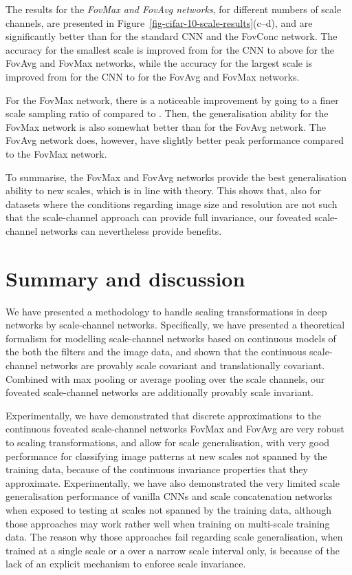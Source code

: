 \documentclass[twocolumn,runningheads]{svjour3}
\begin{document}
The results for the {\em FovMax and FovAvg networks\/}, for different numbers of
scale channels, are presented in Figure~\ref{fig-cifar-10-scale-results}(c--d), and
are significantly better than for the standard CNN and the FovConc
network. The accuracy for the smallest scale  is improved from  
for the CNN to above  for the FovAvg and FovMax networks, while the accuracy 
for the largest scale  is improved from  for the CNN to  for the FovAvg and FovMax networks. 

For the FovMax network, there is a noticeable improvement by going to
a finer scale sampling ratio of  compared to .
Then, the generalisation ability for the FovMax network is also somewhat better than for the
FovAvg network. The FovAvg network does, however, have slightly better peak performance compared to the FovMax network. 

To summarise, the FovMax and FovAvg networks provide the best generalisation
ability to new scales, which is in line with theory.
This shows that, also for datasets where the conditions regarding image size and
resolution are not such that the scale-channel approach can provide
full invariance, our foveated scale-channel networks can nevertheless
provide benefits.



\section{Summary and discussion}

We have presented a methodology to handle scaling transformations in
deep networks by scale-channel networks.
Spec\-ifically, we have presented a theoretical formalism for modelling scale-channel networks
based on continuous models of the both the filters and the image data,
and shown that the continuous scale-channel networks are provably scale
covariant and translationally covariant. Combined with max pooling or
average pooling over the scale channels, our fove\-ated scale-channel networks
are additionally provably scale invariant.

Experimentally, we have demonstrated that discrete approximations
to the continuous foveated scale-channel networks FovMax and FovAvg are very robust to scaling
transformations, and allow for scale generalisation, with very good
performance for classifying image patterns at new scales not spanned by
the training data, because of the continuous invariance properties
that they approximate.
Experimentally, we have also demonstrated the very 
limited scale generalisation performance of vanilla CNNs and
scale concatenation networks 
when exposed to testing at scales not spanned by the training data,
although those approaches may work rather well when training on multi-scale training data. 
The reason why those approaches fail regarding scale generalisation,
when trained at a single scale or a over a narrow scale interval only,
is because of the lack of an explicit mechanism to enforce scale invariance.
\end{document}
